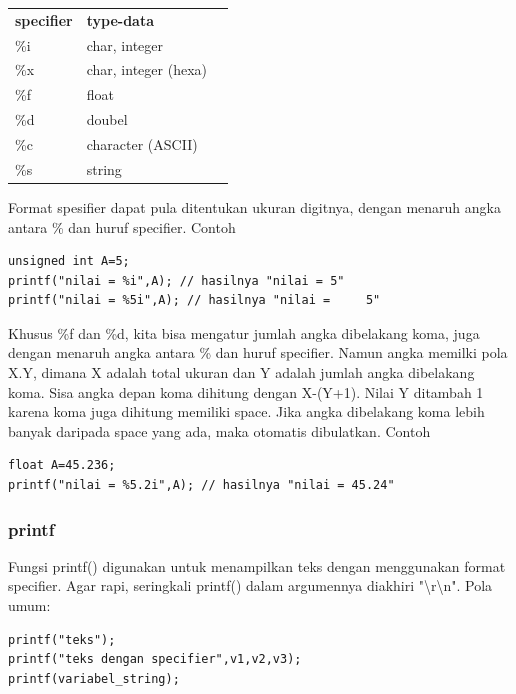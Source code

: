 \documentclass[12pt,]{article}
\begin{document}
	\begin{table}[H]
		\begin{tabular}{|l|l|l}
			\cline{1-2}
			\textbf{specifier} & \textbf{type-data} \\ \cline{1-2}
			\%i & char, integer \\ \cline{1-2}
			\%x & char, integer (hexa) \\ \cline{1-2}
			\%f & float \\ \cline{1-2}
			\%d & doubel \\ \cline{1-2}
			\%c & character (ASCII) \\ \cline{1-2}
			\%s & string \\ \cline{1-2}
		\end{tabular}
	\end{table}

	Format spesifier dapat pula ditentukan ukuran digitnya, dengan menaruh angka antara \% dan huruf specifier. 
	Contoh
	\begin{verbatim}
unsigned int A=5;	
printf("nilai = %i",A); // hasilnya "nilai = 5"
printf("nilai = %5i",A); // hasilnya "nilai =     5"
	\end{verbatim}
	
	Khusus \%f dan \%d, kita bisa mengatur jumlah angka dibelakang koma, juga dengan menaruh angka antara \% dan huruf specifier.
	Namun angka memilki pola X.Y, dimana X adalah total ukuran dan Y adalah jumlah angka dibelakang koma.
	Sisa angka depan koma dihitung dengan X-(Y+1).
	Nilai Y ditambah 1 karena koma juga dihitung memiliki space.
	Jika angka dibelakang koma lebih banyak daripada space yang ada, maka otomatis dibulatkan.
	Contoh
	\begin{verbatim}
float A=45.236;	
printf("nilai = %5.2i",A); // hasilnya "nilai = 45.24"
	\end{verbatim}
	
	\subsubsection{printf}
	
	Fungsi printf() digunakan untuk menampilkan teks dengan menggunakan format specifier.
	Agar rapi, seringkali printf() dalam argumennya diakhiri "\textbackslash r\textbackslash n".
	Pola umum:
	\begin{verbatim}
printf("teks");
printf("teks dengan specifier",v1,v2,v3);
printf(variabel_string);
	\end{verbatim}
	
\end{document}
